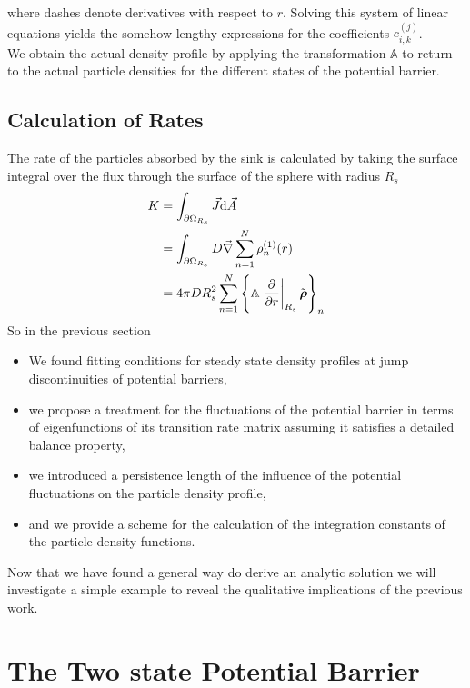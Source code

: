 where dashes denote derivatives with respect to $r$. Solving this system of linear equations yields the somehow lengthy expressions for the coefficients $c_{i,k}^{(j)}$. \\ We obtain the actual density profile by applying the transformation $\mathbb{A}$ to return to the actual particle densities for the different states of the potential barrier.
\subsection{Calculation of Rates}
\label{Rates}
The rate of the particles absorbed by the sink is calculated by taking the surface integral over the flux through the surface of the sphere with radius $R_s$
\begin{align}
    K   &= \int_{\partial \Omega_{R_s}} \vec{J} {\rm d} \vec{A}\nonumber\\
    &= \int_{\partial \Omega_{R_s}} D \vec{\nabla} \sum_{n=1}^{N} \rho_n^{(1)}(r)\nonumber \\
    &= 4 \pi D R_s^{2} \sum_{n=1}^{N} \left\{ \mathbb{A} \left. \frac{\partial}{ \partial r}\right|_{R_s} \tilde{\boldsymbol{\mathbf{\rho}}} \right\}_n
    \label{Rate}
\end{align}
        So in the previous section 
\begin{itemize}
    \item We found fitting conditions for steady state density profiles at jump discontinuities of potential barriers,
    \item we propose a treatment for the fluctuations of the potential barrier in terms of eigenfunctions of its transition rate matrix assuming it satisfies a detailed balance property,
    \item we introduced a persistence length of the influence of the potential fluctuations on the particle density profile,
    \item and we provide a scheme for the calculation of the integration constants of the particle density functions.
\end{itemize}
Now that we have found a general way do derive an analytic solution we will investigate a simple example to reveal the qualitative implications of the previous work. 
\newpage
\section{The Two state Potential Barrier}

